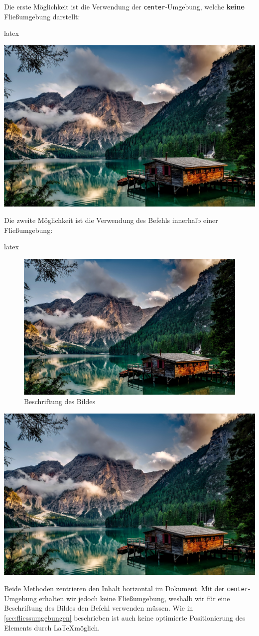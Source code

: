 Die erste Möglichkeit ist die Verwendung der \texttt{center}-Umgebung, welche \textbf{keine} Fließumgebung darstellt:

\begin{showcode}{latex}
    \begin{center}
        \includegraphics[width=0.4\columnwidth]{assets/images/bilder/pexels-pixabay-147411.jpg}
    \end{center}
\end{showcode}

Die zweite Möglichkeit ist die Verwendung des Befehls \texttt{\centering} innerhalb einer Fließumgebung:

\begin{showcase}
    \begin{code}{latex}
        \begin{figure}
            \centering
            \includegraphics[width=0.4\columnwidth]{assets/images/bilder/pexels-pixabay-147411.jpg}
            \caption{Beschriftung des Bildes}
        \end{figure}
    \end{code}
    \tcblower
    \begin{center}
        \includegraphics[width=0.4\columnwidth]{assets/images/bilder/pexels-pixabay-147411.jpg}
    \end{center}
\end{showcase}

Beide Methoden zentrieren den Inhalt horizontal im Dokument. Mit der \texttt{center}-Umgebung erhalten wir jedoch keine Fließumgebung, weshalb wir für eine Beschriftung des Bildes den Befehl \texttt{} verwenden müssen. Wie in \autoref{sec:fliessumgebungen} beschrieben ist auch keine optimierte Positionierung des Elements durch \LaTeX möglich.